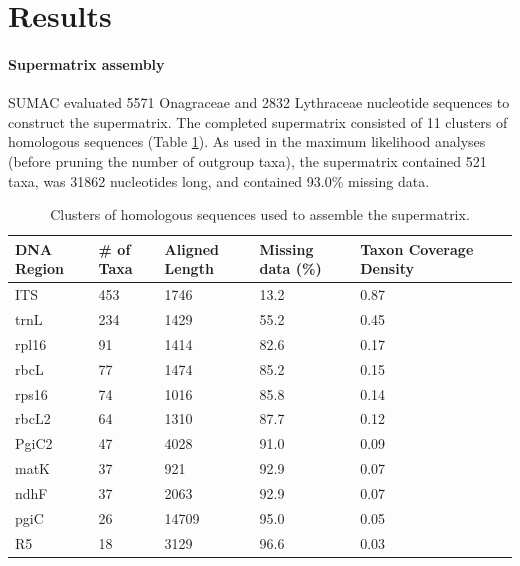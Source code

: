 \documentclass[review]{elsarticle}
\begin{document}

\section{Results}


\paragraph{Supermatrix assembly}
SUMAC evaluated 5571 Onagraceae and 2832 Lythraceae nucleotide sequences to construct the supermatrix. 
The completed supermatrix consisted of 11 clusters of homologous sequences (Table \ref{clusters}).
As used in the maximum likelihood analyses (before pruning the number of outgroup taxa), 
the supermatrix contained 521 taxa, was 31862 nucleotides long, and contained 93.0\% missing data.

\begin{table}
   \center
   \begin{adjustbox}{max width=\textwidth}
      \begin{tabular}{lllllll}
         \toprule
         DNA Region & \# of Taxa & Aligned Length & Missing data (\%) & Taxon Coverage Density \\ 
	 \midrule
         ITS & 453 & 1746 & 13.2 & 0.87 \\
         trnL & 234 & 1429 & 55.2 & 0.45 \\
         rpl16 & 91 & 1414 & 82.6 & 0.17 \\
         rbcL & 77 & 1474 & 85.2 & 0.15 \\
         rps16 & 74 & 1016 & 85.8 & 0.14 \\
         rbcL2 & 64 & 1310 & 87.7 & 0.12 \\
         PgiC2 & 47 & 4028 & 91.0 & 0.09 \\
         matK & 37 & 921 & 92.9 & 0.07 \\
         ndhF & 37 & 2063 & 92.9 & 0.07 \\
         pgiC & 26 & 14709 & 95.0 & 0.05 \\
         R5 & 18 & 3129 & 96.6 & 0.03 \\
         \bottomrule
      \end{tabular}
   \end{adjustbox}
   \caption{Clusters of homologous sequences used to assemble the supermatrix.}
   \label{clusters}
\end{table}
\end{document}
